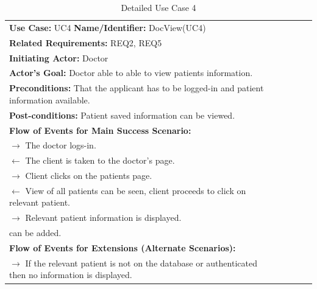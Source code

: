 \documentclass[a4paper]{article}
\begin{document}
\FloatBarrier

\begin{table}[h!]
\centering
\caption*{Detailed Use Case 4}
\label{DetailedUC2}
\begin{tabular}{|c|llll}
\cline{1-1}

\multicolumn{1}{|l|}{\textbf{Use Case:} UC4 \textbf{Name/Identifier:} DocView(UC4)} &  &  &  &  \\ \cline{1-1}

\multicolumn{1}{|l|}{\textbf{Related Requirements:} REQ2, REQ5} &  &  &  &  \\

\multicolumn{1}{|l|}{\textbf{Initiating Actor:} Doctor} &  &  &  &  \\

\multicolumn{1}{|l|}{\textbf{Actor’s Goal:} Doctor able to able to view patients information.} &  &  &  &  \\

\multicolumn{1}{|l|}{\textbf{Preconditions:} That the applicant has to be logged-in and patient information available.} &  &  &  &  \\

\multicolumn{1}{|l|}{\textbf{Post-conditions:} Patient saved information can be viewed.} &  &  &  &  \\

\multicolumn{1}{|l|}{\textbf{Flow of Events for Main Success Scenario:}} &  &  &  &  \\

\multicolumn{1}{|l|}{ $ \rightarrow $ The doctor logs-in.} &  &  &  &  \\

\multicolumn{1}{|l|}{ $ \leftarrow $ The client is taken to the doctor's page.} &  &  &  &  \\

\multicolumn{1}{|l|}{ $ \rightarrow $ Client clicks on the patients page.} &  &  &  &  \\

\multicolumn{1}{|l|}{ $ \leftarrow $ View of all patients can be seen, client proceeds to click on relevant patient. } &  &  &  &  \\

\multicolumn{1}{|l|}{ $ \rightarrow $ Relevant patient information is displayed.} &  &  &  &  \\

\multicolumn{1}{|l|}{can be added.} &  &  &  &  \\

\multicolumn{1}{|l|}{\textbf{Flow of Events for Extensions (Alternate Scenarios):}} &  &  &  &  \\

\multicolumn{1}{|l|}{ $ \rightarrow $ If the relevant patient is not on the database or authenticated then no information is displayed.} &  &  &  &  \\ \cline{1-1}

\end{tabular}
\end{table}
\end{document}
